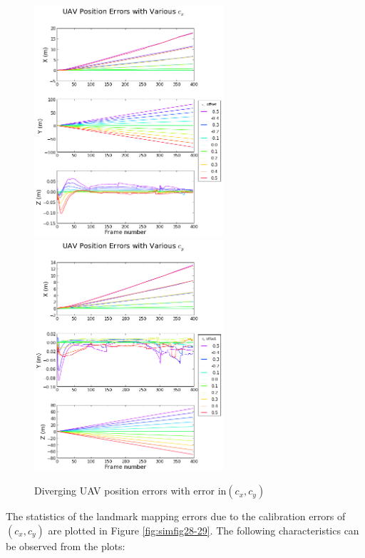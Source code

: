 \begin{figure}[h]
  \centering
  \includegraphics[width=7cm,keepaspectratio=true]{./Figures/SimulationFigures/Figure36.png}
  \includegraphics[width=7cm,keepaspectratio=true]{./Figures/SimulationFigures/Figure37.png}
  \caption{Diverging UAV position errors with error in$(c_x, c_y)$ }
  \label{fig:simfig36-37}
\end{figure}
\FloatBarrier

The statistics of the landmark mapping errors due to the calibration errors of
$(c_{x}, c_{y})$ are plotted in Figure \ref{fig:simfig28-29}. The
following characteristics can be observed from the plots:

